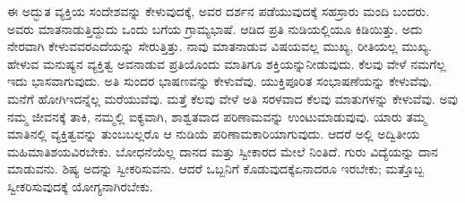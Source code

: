 ಈ ಅದ್ಭುತ ವ್ಯಕ್ತಿಯ ಸಂದೇಶವನ್ನು ಕೇಳುವುದಕ್ಕೆ, ಅವರ ದರ್ಶನ ಪಡೆಯುವು\-ದಕ್ಕೆ ಸಹಸ್ರಾರು ಮಂದಿ ಬಂದರು. ಅವರು ಮಾತನಾಡುತ್ತಿದ್ದುದು ಒಂದು ಬಗೆಯ ಗ್ರಾಮ್ಯಭಾಷೆ. ಆಡಿದ ಪ್ರತಿ ನುಡಿಯಲ್ಲಿಯೂ ಕಿಡಿಯಿತ್ತು. ಅದು ನೇರವಾಗಿ ಕೇಳುವವರ\break ಎದೆಯನ್ನು ಸೇರುತ್ತಿತ್ತು. ನಾವು ಮಾತನಾಡುವ ವಿಷಯವಲ್ಲ ಮುಖ್ಯ, ರೀತಿಯಲ್ಲ ಮುಖ್ಯ. ಹೇಳುವ ಮನುಷ್ಯನ ವ್ಯಕ್ತಿತ್ವ ಅವನಾಡುವ ಪ್ರತಿಯೊಂದು ಮಾತಿಗೂ ಶಕ್ತಿಯನ್ನು\break ನೀಡುವುದು. ಕೆಲವು ವೇಳೆ ನಮಗೆಲ್ಲ ಇದು ಭಾಸವಾಗುವುದು. ಅತಿ ಸುಂದರ ಭಾಷಣವನ್ನು ಕೇಳುವೆವು. ಯುಕ್ತಿಪೂರಿತ ಸಂಭಾಷಣೆಯನ್ನು ಕೇಳುವೆವು. ಮನೆಗೆ ಹೋಗಿ\break ಇದನ್ನೆಲ್ಲ ಮರೆಯುವೆವು. ಮತ್ತೆ ಕೆಲವು ವೇಳೆ ಅತಿ ಸರಳವಾದ ಕೆಲವು ಮಾತುಗಳನ್ನು ಕೇಳುವೆವು. ಅವು ನಮ್ಮ ಜೀವನಕ್ಕೆ ತಾಕಿ, ನಮ್ಮಲ್ಲಿ ಐಕ್ಯವಾಗಿ, ಶಾಶ್ವತವಾದ ಪರಿಣಾಮವನ್ನು ಉಂಟುಮಾಡುವುವು. ಯಾರು ತಮ್ಮ ಮಾತಿನಲ್ಲಿ ವ್ಯಕ್ತಿತ್ವವನ್ನು ತುಂಬಬಲ್ಲರೊ ಆ ನುಡಿಯೆ ಪರಿಣಾಮಕಾರಿಯಾಗುವುದು. ಆದರೆ ಅಲ್ಲಿ ಅದ್ವಿತೀಯ ಮಹಿಮಾತಿಶಯವಿರಬೇಕು. ಬೋಧನೆಯೆಲ್ಲ ದಾನದ ಮತ್ತು ಸ್ವೀಕಾರದ ಮೇಲೆ ನಿಂತಿದೆ. ಗುರು ವಿದ್ಯೆಯನ್ನು ದಾನ ಮಾಡುವನು. ಶಿಷ್ಯ ಅದನ್ನು ಸ್ವೀಕರಿಸುವನು. ಆದರೆ ಒಬ್ಬನಿಗೆ ಕೊಡುವುದಕ್ಕೆ\break ಏನಾದರೂ ಇರಬೇಕು; ಮತ್ತೊಬ್ಬ ಸ್ವೀಕರಿಸುವುದಕ್ಕೆ ಯೋಗ್ಯನಾಗಿರಬೇಕು.

